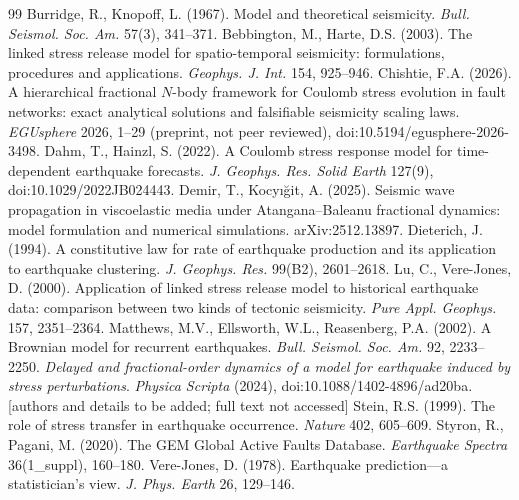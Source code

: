 \documentclass[11pt,a4paper]{article}
\begin{document}
\begin{thebibliography}{99}\small
{} Burridge, R., Knopoff, L. (1967). Model and theoretical seismicity. \emph{Bull. Seismol. Soc. Am.} 57(3), 341--371.
 Bebbington, M., Harte, D.S. (2003). The linked stress release model for spatio-temporal seismicity: formulations, procedures and applications. \emph{Geophys. J. Int.} 154, 925--946.
 Chishtie, F.A. (2026). A hierarchical fractional $N$-body framework for Coulomb stress evolution in fault networks: exact analytical solutions and falsifiable seismicity scaling laws. \emph{EGUsphere} 2026, 1--29 (preprint, not peer reviewed), doi:10.5194/egusphere-2026-3498.
 Dahm, T., Hainzl, S. (2022). A Coulomb stress response model for time-dependent earthquake forecasts. \emph{J. Geophys. Res. Solid Earth} 127(9), doi:10.1029/2022JB024443.
 Demir, T., Kocy{\i}{\u g}it, A. (2025). Seismic wave propagation in viscoelastic media under Atangana--Baleanu fractional dynamics: model formulation and numerical simulations. arXiv:2512.13897.
 Dieterich, J. (1994). A constitutive law for rate of earthquake production and its application to earthquake clustering. \emph{J. Geophys. Res.} 99(B2), 2601--2618.
 Lu, C., Vere-Jones, D. (2000). Application of linked stress release model to historical earthquake data: comparison between two kinds of tectonic seismicity. \emph{Pure Appl. Geophys.} 157, 2351--2364.
 Matthews, M.V., Ellsworth, W.L., Reasenberg, P.A. (2002). A Brownian model for recurrent earthquakes. \emph{Bull. Seismol. Soc. Am.} 92, 2233--2250.
 \emph{Delayed and fractional-order dynamics of a model for earthquake induced by stress perturbations}. \emph{Physica Scripta} (2024), doi:10.1088/1402-4896/ad20ba. [authors and details to be added; full text not accessed]
 Stein, R.S. (1999). The role of stress transfer in earthquake occurrence. \emph{Nature} 402, 605--609.
 Styron, R., Pagani, M. (2020). The GEM Global Active Faults Database. \emph{Earthquake Spectra} 36(1\_suppl), 160--180.
 Vere-Jones, D. (1978). Earthquake prediction---a statistician's view. \emph{J. Phys. Earth} 26, 129--146.

\end{thebibliography}
\end{document}
